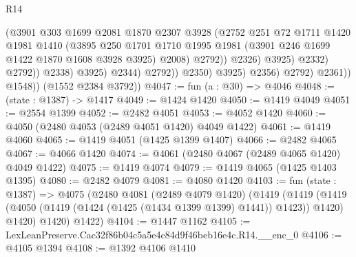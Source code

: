 \begin{lexlean}{R14}
\begin{coremodule}
                                          (@3901
                                            @303
                                            @1699
                                            @2081
                                            @1870
                                            @2307
                                            @3928
                                            (@2752
                                              @251
                                              @72
                                              @1711
                                              @1420
                                              @1981
                                              @1410
                                              (@3895
                                                @250
                                                @1701
                                                @1710
                                                @1995
                                                @1981
                                                (@3901 @246 @1699 @1422 @1870 @1608 @3928 @3925)
                                                @2008)
                                              @2792))
                                          @2326)
                                        @3925)
                                      @2332)
                                    @2792))
                                @2338)
                              @3925)
                            @2344)
                          @2792))
                      @2350)
                    @3925)
                  @2356)
                @2792)
              @2361))
          @1548))
      (@1552 @2384 @3792))
@4047 := fun (a : @30) => @4046
@4048 := (state : @1387) -> @1417
@4049 := @1424 @1420
@4050 := @1419 @4049
@4051 := @2554 @1399
@4052 := @2482 @4051
@4053 := @4052 @1420
@4060 := @4050 (@2480 @4053 (@2489 @4051 @1420) @4049 @1422)
@4061 := @1419 @4060
@4065 := @1419 @4051 (@1425 @1399 @1407)
@4066 := @2482 @4065
@4067 := @4066 @1420
@4074 := @4061 (@2480 @4067 (@2489 @4065 @1420) @4049 @1422)
@4075 := @1419 @4074
@4079 := @1419 @4065 (@1425 @1403 @1395)
@4080 := @2482 @4079
@4081 := @4080 @1420
@4103 := fun (state : @1387) =>
  @4075
    (@2480
      @4081
      (@2489 @4079 @1420)
      (@1419
        (@1419 (@1419 (@4050 (@1419 (@1424 (@1425 (@1434 @1399 @1399) @1441)) @1423)) @1420) @1420)
        @1420)
      @1422)
@4104 := @1447 @1162
@4105 := LexLeanPreserve.Cac32f86b04c5a5e4c84d9f46beb16e4c.R14.__enc_0
@4106 := @4105 @1394
@4108 := @1392 @4106 @1410

\end{coremodule}
\end{lexlean}
